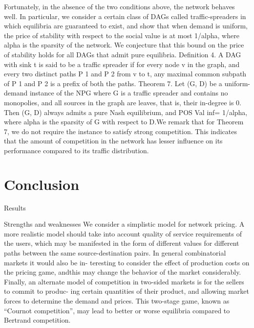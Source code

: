 \documentclass{beamer}
\begin{document}
\begin{frame}
Fortunately, in the absence of the two conditions above, the network behaves
well. In particular, we consider a certain class of DAGs called traffic-spreaders
in which equilibria are guaranteed to exist, and show that when demand is
uniform, the price of stability with respect to the social value is at most 1/alpha,
where alpha is the sparsity of the network. We conjecture that this bound on the
price of stability holds for all DAGs that admit pure equilibria.
Definition 4. A DAG with sink t is said to be a traffic spreader if for every
node v in the graph, and every two distinct paths P 1 and P 2 from v to t, any
maximal common subpath of P 1 and P 2 is a prefix of both the paths.
Theorem 7. Let (G, D) be a uniform-demand instance of the NPG where G
is a traffic spreader and contains no monopolies, and all sources in the graph
are leaves, that is, their in-degree is 0. Then (G, D) always admits a pure Nash
equilibrium, and POS Val inf= 1/alpha, where alpha is the sparsity of G with respect to D.We remark that for Theorem 7, we do not require the instance to satisfy strong
competition. This indicates that the amount of competition in the network has
lesser influence on its performance compared to its traffic distribution.
\end{frame}

\section{Conclusion}

\begin{frame}{Results}
\end{frame}

\begin{frame}{Strengths and weaknesses}
We consider a simplistic model for network pricing. A more realistic model should
take into account quality of service requirements of the users, which may be
manifested in the form of different values for different paths between the same
source-destination pairs. In general combinatorial markets it would also be in-
teresting to consider the effect of production costs on the pricing game, andthis may change the behavior of the market considerably. Finally, an alternate
model of competition in two-sided markets is for the sellers to commit to produc-
ing certain quantities of their product, and allowing market forces to determine
the demand and prices. This two-stage game, known as “Cournot competition”,
may lead to better or worse equilibria compared to Bertrand competition.
\end{frame}
\end{document}

